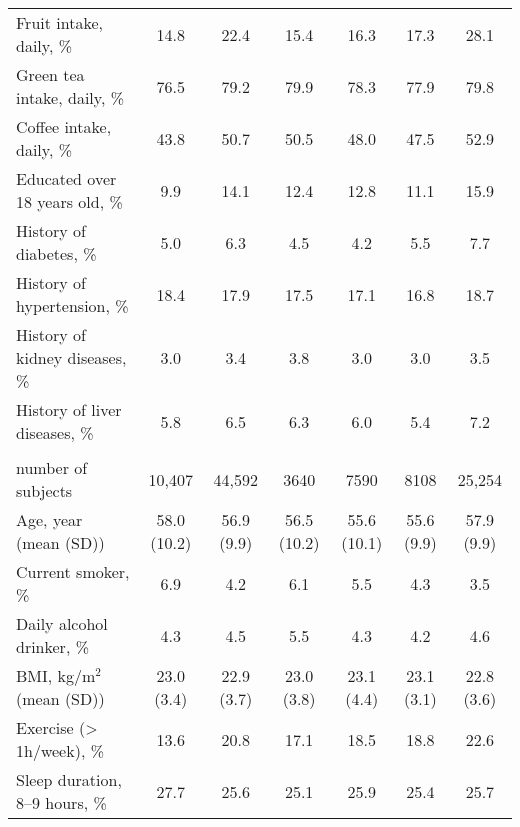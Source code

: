 \documentclass[nutrients,article,accept,moreauthors,pdftex]{Definitions/mdpi}
\begin{document}
\begin{table}[H]
{\begin{tabular}[t]{lcccccc}
   \hspace{1em}Fruit intake, daily, \% & 14.8 & 22.4 & 15.4 & 16.3 & 17.3 & 28.1\\
\hspace{1em}Green tea intake, daily, \% & 76.5 & 79.2 & 79.9 & 78.3 & 77.9 & 79.8\\
   \hspace{1em}Coffee intake, daily, \% & 43.8 & 50.7 & 50.5 & 48.0 & 47.5 & 52.9\\
\hspace{1em}Educated over 18 years old, \% & 9.9 & 14.1 & 12.4 & 12.8 & 11.1 & 15.9 \\
   \hspace{1em}History of diabetes, \% & 5.0 & 6.3 & 4.5 & 4.2 & 5.5 & 7.7\\
\hspace{1em}History of hypertension, \% & 18.4 & 17.9 & 17.5 & 17.1 & 16.8 & 18.7\\
   \hspace{1em}History of kidney diseases, \% & 3.0 & 3.4 & 3.8 & 3.0 & 3.0 & 3.5\\
\hspace{1em}History of liver diseases, \% & 5.8 & 6.5 & 6.3 & 6.0 & 5.4 & 7.2\\
   \addlinespace[0.3em]
\multicolumn{7}{l}{\textbf{Women (\emph{n} = 54,999)}}\\
\hspace{1em}number of subjects & 10,407 & 44,592 & 3640 & 7590 & 8108 & 25,254\\
\hspace{1em}Age, year (mean (SD)) & 58.0 (10.2) & 56.9 (9.9) & 56.5 (10.2) & 55.6 (10.1) & 55.6 (9.9) & 57.9 (9.9)\\
   \hspace{1em}Current smoker, \% & 6.9 & 4.2 & 6.1 & 5.5 & 4.3 & 3.5\\
\hspace{1em}Daily alcohol drinker, \% & 4.3 & 4.5 & 5.5 & 4.3 & 4.2 & 4.6\\
   \hspace{1em}BMI, kg/m$^2$ (mean (SD)) & 23.0 (3.4) & 22.9 (3.7) & 23.0 (3.8) & 23.1 (4.4) & 23.1 (3.1) & 22.8 (3.6)\\
\hspace{1em}Exercise (> 1h/week), \% & 13.6 & 20.8 & 17.1 & 18.5 & 18.8 & 22.6\\
   \hspace{1em}Sleep duration, 8--9 hours, \% & 27.7 & 25.6 & 25.1 & 25.9 & 25.4 & 25.7\\

\end{tabular}}
\end{table}
\end{document}
